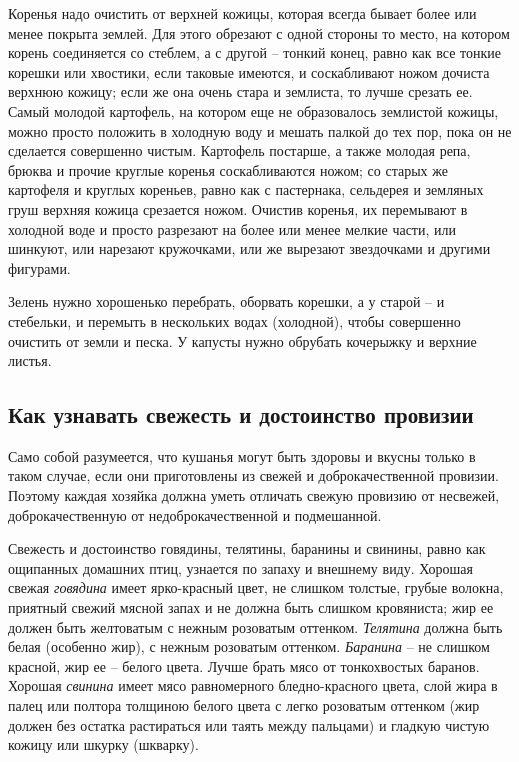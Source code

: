 Коренья надо очистить от верхней кожицы, которая всегда бывает более или менее покрыта землей. Для этого обрезают с одной стороны то место, на котором корень соединяется со стеблем, а с другой – тонкий конец, равно как все тонкие корешки или хвостики, если таковые имеются, и соскабливают ножом дочиста верхнюю кожицу; если же она очень стара и землиста, то лучше срезать ее. Самый молодой картофель, на котором еще не образовалось землистой кожицы, можно просто положить в холодную воду и мешать палкой до тех пор, пока он не сделается совершенно чистым. Картофель постарше, а также молодая репа, брюква и прочие круглые коренья соскабливаются ножом; со старых же картофеля и круглых кореньев, равно как с пастернака, сельдерея и земляных груш верхняя кожица срезается ножом. Очистив коренья, их перемывают в холодной воде и просто разрезают на более или менее мелкие части, или шинкуют, или нарезают кружочками, или же вырезают звездочками и другими фигурами.

Зелень нужно хорошенько перебрать, оборвать корешки, а у старой – и стебельки, и перемыть в нескольких водах (холодной), чтобы совершенно очистить от земли и песка. У капусты нужно обрубать кочерыжку и верхние листья.

\subsection{Как узнавать свежесть и достоинство провизии}

Само собой разумеется, что кушанья могут быть здоровы и вкусны только в таком случае, если они приготовлены из свежей и доброкачественной провизии. Поэтому каждая хозяйка должна уметь отличать свежую провизию от несвежей, доброкачественную от недоброкачественной и подмешанной.

Свежесть и достоинство говядины, телятины, баранины и свинины, равно как ощипанных домашних птиц, узнается по запаху и внешнему виду. Хорошая свежая \emph{говядина} имеет ярко-красный цвет, не слишком толстые, грубые волокна, приятный свежий мясной запах и не должна быть слишком кровяниста; жир ее должен быть желтоватым с нежным розоватым оттенком. \emph{Телятина} должна быть белая (особенно жир), с нежным розоватым оттенком. \emph{Баранина} – не слишком красной, жир ее – белого цвета. Лучше брать мясо от тонкохвостых баранов. Хорошая \emph{свинина} имеет мясо равномерного бледно-красного цвета, слой жира в палец или полтора толщиною белого цвета с легко розоватым оттенком (жир должен без остатка растираться или таять между пальцами) и гладкую чистую кожицу или шкурку (шкварку).

